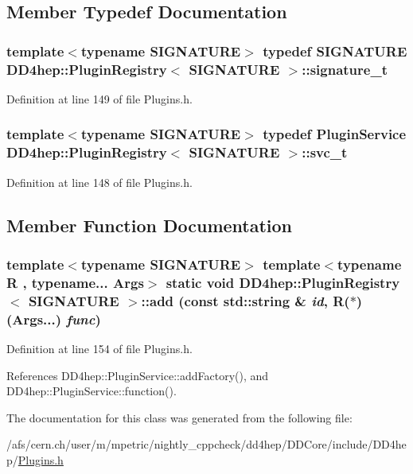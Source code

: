 \subsection{Member Typedef Documentation}
\hypertarget{class_d_d4hep_1_1_plugin_registry_a7027450dd9c05ba16111485082222ade}{
\subsubsection[{signature\_\-t}]{\setlength{\rightskip}{0pt plus 5cm}template$<$typename SIGNATURE$>$ typedef SIGNATURE {\bf DD4hep::PluginRegistry}$<$ SIGNATURE $>$::{\bf signature\_\-t}}}
\label{class_d_d4hep_1_1_plugin_registry_a7027450dd9c05ba16111485082222ade}


Definition at line 149 of file Plugins.h.\hypertarget{class_d_d4hep_1_1_plugin_registry_a4a7136b1696a7da6212af835482dece9}{
\subsubsection[{svc\_\-t}]{\setlength{\rightskip}{0pt plus 5cm}template$<$typename SIGNATURE$>$ typedef {\bf PluginService} {\bf DD4hep::PluginRegistry}$<$ SIGNATURE $>$::{\bf svc\_\-t}}}
\label{class_d_d4hep_1_1_plugin_registry_a4a7136b1696a7da6212af835482dece9}


Definition at line 148 of file Plugins.h.

\subsection{Member Function Documentation}
\hypertarget{class_d_d4hep_1_1_plugin_registry_a85c15e78a251333b0cfc3b47f6b0172f}{
\subsubsection[{add}]{\setlength{\rightskip}{0pt plus 5cm}template$<$typename SIGNATURE$>$ template$<$typename R , typename... Args$>$ static void {\bf DD4hep::PluginRegistry}$<$ SIGNATURE $>$::add (const std::string \& {\em id}, \/  R($\ast$)(Args...) {\em func})}}
\label{class_d_d4hep_1_1_plugin_registry_a85c15e78a251333b0cfc3b47f6b0172f}


Definition at line 154 of file Plugins.h.

References DD4hep::PluginService::addFactory(), and DD4hep::PluginService::function().

The documentation for this class was generated from the following file:\begin{DoxyCompactItemize}
\item 
/afs/cern.ch/user/m/mpetric/nightly\_\-cppcheck/dd4hep/DDCore/include/DD4hep/\hyperlink{_plugins_8h}{Plugins.h}\end{DoxyCompactItemize}
